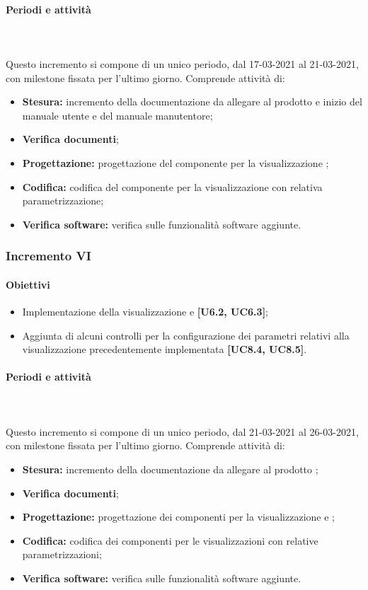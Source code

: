 \paragraph{Periodi e attività} \mbox{}\\\mbox{}\\
Questo incremento si compone di un unico periodo, dal 17-03-2021 al 21-03-2021, con milestone fissata per l'ultimo giorno. Comprende attività di:
\begin{itemize}
\item \textbf{Stesura:} incremento della documentazione da allegare al prodotto e inizio del manuale utente e del manuale manutentore;
\item \textbf{Verifica documenti};
\item \textbf{Progettazione:} progettazione del componente per la visualizzazione ;
\item \textbf{Codifica:} codifica del componente per la visualizzazione con relativa parametrizzazione;
\item \textbf{Verifica software:} verifica sulle funzionalità software aggiunte.
\end{itemize}

\subsubsection{Incremento VI}

\paragraph{Obiettivi}
\begin{itemize}
\item Implementazione della visualizzazione  e  \textbf{[U6.2, UC6.3]};
\item Aggiunta di alcuni controlli per la configurazione dei parametri relativi alla visualizzazione precedentemente implementata \textbf{[UC8.4, UC8.5]}.
\end{itemize}

\paragraph{Periodi e attività} \mbox{}\\\mbox{}\\
Questo incremento si compone di un unico periodo, dal 21-03-2021 al 26-03-2021, con milestone fissata per l'ultimo giorno. Comprende attività di:
\begin{itemize}
\item \textbf{Stesura:} incremento della documentazione da allegare al prodotto ;
\item \textbf{Verifica documenti};
\item \textbf{Progettazione:} progettazione dei componenti per la visualizzazione  e ;
\item \textbf{Codifica:} codifica dei componenti per le visualizzazioni con relative parametrizzazioni;
\item \textbf{Verifica software:} verifica sulle funzionalità software aggiunte.
\end{itemize}

